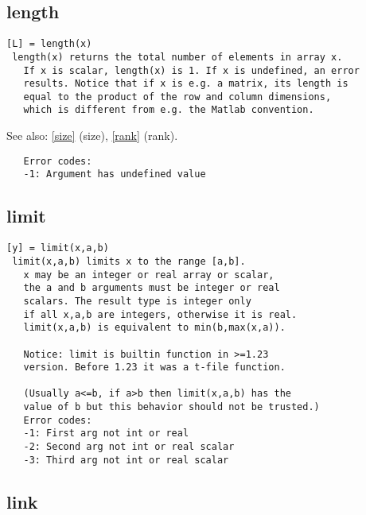\documentclass[a4paper]{article}
\begin{document}
\subsection{length\label{length}}

\begin{tscreen}
\begin{verbatim}
[L] = length(x)
 length(x) returns the total number of elements in array x.
   If x is scalar, length(x) is 1. If x is undefined, an error
   results. Notice that if x is e.g. a matrix, its length is
   equal to the product of the row and column dimensions,
   which is different from e.g. the Matlab convention.
\end{verbatim}

See also: \ref{size} {(size)}, \ref{rank} {(rank)}.
\begin{verbatim}
   Error codes:
   -1: Argument has undefined value 
\end{verbatim}
\end{tscreen}





\subsection{limit\label{limit}}

\begin{tscreen}
\begin{verbatim}
[y] = limit(x,a,b)
 limit(x,a,b) limits x to the range [a,b].
   x may be an integer or real array or scalar,
   the a and b arguments must be integer or real
   scalars. The result type is integer only
   if all x,a,b are integers, otherwise it is real.
   limit(x,a,b) is equivalent to min(b,max(x,a)).

   Notice: limit is builtin function in >=1.23
   version. Before 1.23 it was a t-file function.

   (Usually a<=b, if a>b then limit(x,a,b) has the
   value of b but this behavior should not be trusted.)
   Error codes:
   -1: First arg not int or real
   -2: Second arg not int or real scalar
   -3: Third arg not int or real scalar
\end{verbatim}
\end{tscreen}





\subsection{link\label{link}}
\end{document}
